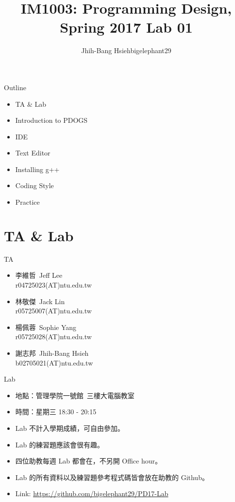 \documentclass[t]{beamer}
\title{IM1003: Programming Design, Spring 2017  \linebreak Lab 01}
\author[bigelephant29]{Jhih-Bang Hsieh\linebreak \small{bigelephant29}}
\institute{\textbf{National Taiwan University}}
\date{}
\begin{document}
\begin{frame}
\maketitle
\end{frame}

\begin{frame}{Outline}
\begin{itemize}
\item TA \& Lab
\item Introduction to PDOGS
\item IDE
\item Text Editor
\item Installing g++
\item Coding Style
\item Practice
\end{itemize}
\end{frame}

\section{TA \& Lab}
\begin{frame}{TA}
\begin{itemize}
  \setlength\itemsep{1em}
\item
李維哲\ Jeff Lee\\
r04725023(AT)ntu.edu.tw
\item
林敬傑\ Jack Lin\\
r05725007(AT)ntu.edu.tw
\item
楊佩蓉\ Sophie Yang\\
r05725028(AT)ntu.edu.tw
\item
謝志邦\ Jhih-Bang Hsieh\\
b02705021(AT)ntu.edu.tw
\end{itemize}
\end{frame}

\begin{frame}{Lab}
\begin{itemize}
\item 地點：管理學院一號館\ 三樓大電腦教室
\item 時間：星期三 18:30 - 20:15
\item Lab 不計入學期成績，可自由參加。
\item Lab 的練習題應該會很有趣。
\item 四位助教每週 Lab 都會在，不另開 Office hour。
\item Lab 的所有資料以及練習題參考程式碼皆會放在助教的 Github。
\item Link: \href{https://github.com/bigelephant29/PD17-Lab}{https://github.com/bigelephant29/PD17-Lab}
\end{itemize}
\end{frame}
\end{document}
